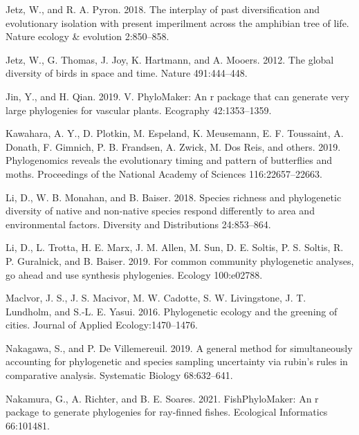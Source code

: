 \documentclass[
  12pt,
]{article}
\newlength{\cslhangindent}
\newlength{\cslentryspacingunit} %
\newenvironment{CSLReferences}[2] %
 {%
  \setlength{\parindent}{0pt}
  \ifodd #1
  \let\oldpar\par
  \def\par{\hangindent=\cslhangindent\oldpar}
  \fi
  \setlength{\parskip}{#2\cslentryspacingunit}
 }%
 {}
\begin{document}
\begin{CSLReferences}{1}{0}
\leavevmode{}%
Jetz, W., and R. A. Pyron. 2018. The interplay of past diversification and evolutionary isolation with present imperilment across the amphibian tree of life. Nature ecology \& evolution 2:850--858.

\leavevmode{}%
Jetz, W., G. Thomas, J. Joy, K. Hartmann, and A. Mooers. 2012. The global diversity of birds in space and time. Nature 491:444--448.

\leavevmode{}%
Jin, Y., and H. Qian. 2019. V. PhyloMaker: An r package that can generate very large phylogenies for vascular plants. Ecography 42:1353--1359.

\leavevmode{}%
Kawahara, A. Y., D. Plotkin, M. Espeland, K. Meusemann, E. F. Toussaint, A. Donath, F. Gimnich, P. B. Frandsen, A. Zwick, M. Dos Reis, and others. 2019. Phylogenomics reveals the evolutionary timing and pattern of butterflies and moths. Proceedings of the National Academy of Sciences 116:22657--22663.

\leavevmode{}%
Li, D., W. B. Monahan, and B. Baiser. 2018. Species richness and phylogenetic diversity of native and non-native species respond differently to area and environmental factors. Diversity and Distributions 24:853--864.

\leavevmode{}%
Li, D., L. Trotta, H. E. Marx, J. M. Allen, M. Sun, D. E. Soltis, P. S. Soltis, R. P. Guralnick, and B. Baiser. 2019. For common community phylogenetic analyses, go ahead and use synthesis phylogenies. Ecology 100:e02788.

\leavevmode{}%
Maclvor, J. S., J. S. Macivor, M. W. Cadotte, S. W. Livingstone, J. T. Lundholm, and S.-L. E. Yasui. 2016. Phylogenetic ecology and the greening of cities. Journal of Applied Ecology:1470--1476.

\leavevmode{}%
Nakagawa, S., and P. De Villemereuil. 2019. A general method for simultaneously accounting for phylogenetic and species sampling uncertainty via rubin's rules in comparative analysis. Systematic Biology 68:632--641.

\leavevmode{}%
Nakamura, G., A. Richter, and B. E. Soares. 2021. FishPhyloMaker: An r package to generate phylogenies for ray-finned fishes. Ecological Informatics 66:101481.


\end{CSLReferences}
\end{document}

